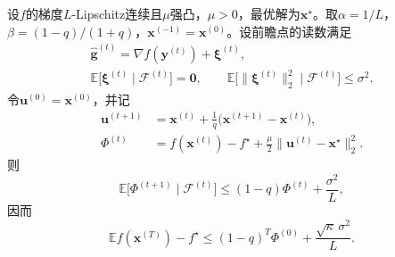 \begin{theorem}[强凸情形下随机Nesterov方法的势函数递推]
\label{thm:sgdb-nag-noise}
设$f$的梯度$L$-Lipschitz连续且$\mu$强凸，$\mu>0$，最优解为$\bm{x}^\star$。取$\alpha=1/L$，$\beta=(1-q)/(1+q)$，$\bm{x}^{(-1)}=\bm{x}^{(0)}$。设前瞻点的读数满足
\begin{equation}
 \begin{gathered}
 \hat{\bm g}^{(t)}=\nabla f(\bm{y}^{(t)})+\bm{\xi}^{(t)},\\
 \mathbb{E}\bigl[\bm{\xi}^{(t)}\mid\mathcal{F}^{(t)}\bigr]=\bm{0},\qquad
 \mathbb{E}\bigl[\lVert\bm{\xi}^{(t)}\rVert_2^2\mid\mathcal{F}^{(t)}\bigr]\leq\sigma^2.
 \end{gathered}
 \label{eq:sgdb-nag-noise-condition}
\end{equation}
令$\bm{u}^{(0)}=\bm{x}^{(0)}$，并记
\begin{equation}
 \begin{aligned}
 \bm{u}^{(t+1)}&=\bm{x}^{(t)}+\frac1q\bigl(\bm{x}^{(t+1)}-\bm{x}^{(t)}\bigr),\\
 \Phi^{(t)}&=f(\bm{x}^{(t)})-f^\star+\frac\mu2\lVert\bm{u}^{(t)}-\bm{x}^\star\rVert_2^2.
 \end{aligned}
 \label{eq:sgdb-nag-potential}
\end{equation}
则
\begin{equation}
 \mathbb{E}\bigl[\Phi^{(t+1)}\mid\mathcal{F}^{(t)}\bigr]\leq(1-q)\Phi^{(t)}+\frac{\sigma^2}{L},
 \label{eq:sgdb-nag-recursion}
\end{equation}
因而
\begin{equation}
 \mathbb{E}f(\bm{x}^{(T)})-f^\star\leq(1-q)^T\Phi^{(0)}+\frac{\sqrt\kappa\,\sigma^2}{L}.
 \label{eq:sgdb-nag-bound}
\end{equation}
\end{theorem}

